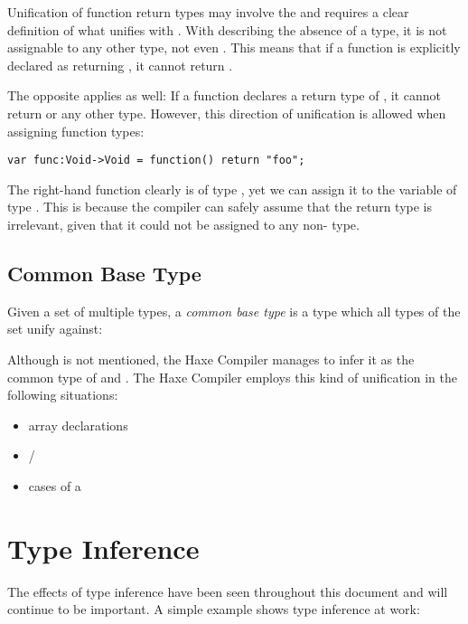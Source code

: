 Unification of function return types may involve the  and requires a clear definition of what unifies with . With  describing the absence of a type, it is not assignable to any other type, not even . This means that if a function is explicitly declared as returning , it cannot return .

The opposite applies as well: If a function declares a return type of , it cannot return  or any other type. However, this direction of unification is allowed when assigning function types:

\begin{lstlisting}
var func:Void->Void = function() return "foo";
\end{lstlisting}

The right-hand function clearly is of type , yet we can assign it to the variable  of type . This is because the compiler can safely assume that the return type is irrelevant, given that it could not be assigned to any non- type.


\subsection{Common Base Type}
\label{type-system-unification-common-base-type}

Given a set of multiple types, a \emph{common base type} is a type which all types of the set unify against:

Although  is not mentioned, the Haxe Compiler manages to infer it as the common type of  and . The Haxe Compiler employs this kind of unification in the following situations:

\begin{itemize}
	\item array declarations
	\item {}/
	\item cases of a 
\end{itemize}




\section{Type Inference}
\label{type-system-type-inference}

The effects of type inference have been seen throughout this document and will continue to be important. A simple example shows type inference at work:

